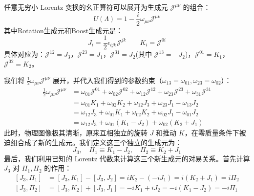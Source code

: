 \vspace{2ex}
任意无穷小 Lorentz 变换的幺正算符可以展开为生成元 $\mathscr{J}^{\mu\nu}$ 的组合：
\begin{equation}
    U(\Lambda) = 1 - \frac{i}{2} \omega_{\mu\nu} \mathscr{J}^{\mu\nu}
\end{equation}
其中Rotation生成元和Boost生成元是：
\begin{equation}
    J_i = \frac{1}{2}\epsilon_{ijk}\mathscr{J}^{jk}\qquad
    K_i =\mathscr{J}^{0i}
\end{equation}
具体对应为：$\mathscr{J}^{12} = J_3$，$\mathscr{J}^{23} = J_1$，$\mathscr{J}^{31} = J_2$(其中 $\mathscr{J}^{13} = -J_2$)，$\mathscr{J}^{01} = K_1$，$\mathscr{J}^{02} = K_2$。
\vspace{2ex}
\par
我们将 $\frac{1}{2} \omega_{\mu\nu} \mathscr{J}^{\mu\nu}$ 展开，并代入我们得到的参数约束（$\omega_{13}=\omega_{01}, \omega_{23}=\omega_{02}$）：
\begin{align}
    \frac{1}{2} \omega_{\mu\nu} \mathscr{J}^{\mu\nu} &= \omega_{01}\mathscr{J}^{01} + \omega_{02}\mathscr{J}^{02} + \omega_{12}\mathscr{J}^{12} + \omega_{23}\mathscr{J}^{23} + \omega_{31}\mathscr{J}^{31} \nonumber \\
    &= \omega_{01}K_1 + \omega_{02}K_2 + \omega_{12}J_3 + \omega_{23}J_1 - \omega_{13}J_2 \nonumber \\
    &= \omega_{12}J_3 + \omega_{01}K_1 + \omega_{02}K_2 + \omega_{02}J_1 - \omega_{01}J_2 \nonumber \\
    &= \omega_{12} J_3 + \omega_{01} (K_1 - J_2) + \omega_{02} (K_2 + J_1)
\end{align}\label{massless_lorentz_transf}
此时，物理图像极其清晰，原来互相独立的旋转 $J$ 和推动 $K$，在零质量条件下被迫组合成了新的生成元。我们定义这三个独立的生成元为：
\begin{equation}
    J_3, \quad \Pi_1 \equiv K_1 - J_2, \quad \Pi_2 \equiv K_2 + J_1
\end{equation}
\vspace{2ex}
最后，我们利用已知的 Lorentz 代数来计算这三个新生成元的对易关系。首先计算 $J_3$ 对 $\Pi_1, \Pi_2$ 的作用：
\begin{subequations}
    \begin{align}
    [J_3, \Pi_1] &= [J_3, K_1] - [J_3, J_2] = iK_2 - (-iJ_1) = i(K_2 + J_1) = i\Pi_2 \\
    [J_3, \Pi_2] &= [J_3, K_2] + [J_3, J_1] = -iK_1 + iJ_2 = -i(K_1 - J_2) = -i\Pi_1
\end{align}
\end{subequations}
